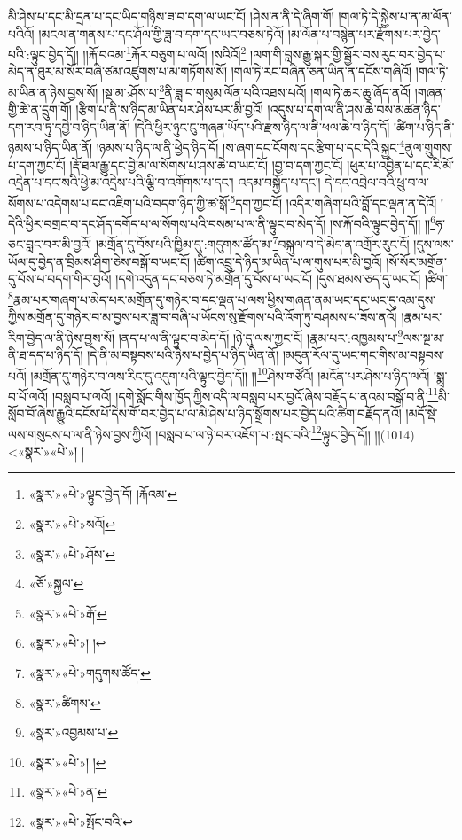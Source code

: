 མི་ཤེས་པ་དང་མི་དྲན་པ་དང་ཡིད་གཉིས་ཟ་བ་དག་ལ་ཡང་ངོ། །ཤེས་ན་ནི་དེ་ཞིག་གོ། །གལ་ཏེ་དེ་སྐྱེས་པ་ན་མ་ལོན་པའིའོ། །མངལ་ན་གནས་པ་དང་ཤོལ་གྱི་ཟླ་བ་དག་དང་ཡང་བཅས་ཏེའོ། །མ་ལོན་པ་བསྙེན་པར་རྫོགས་པར་བྱེད་པའི་:ལྟུང་བྱེད་དོ།། །།རྐོ་བའམ་\footnote{«སྣར་»«པེ་»ལྟུང་བྱེད་དོ། །རྐོའམ་}རྐོར་བཅུག་པ་ལའོ། །སའིའོ།\footnote{«སྣར་»«པེ་»སའོ།} །ལག་གི་བླས་རྒྱུ་སྐར་གྱི་སྦྱོར་བས་རུང་བར་བྱེད་པ་མེད་ན་ཐུར་མ་སོར་བཞི་ཙམ་འཛུགས་པ་མ་གཏོགས་སོ། །གལ་ཏེ་རང་བཞིན་ཅན་ཡིན་ན་དངོས་གཞིའོ། །གལ་ཏེ་མ་ཡིན་ན་ཉེས་བྱས་སོ། །སྔ་མ་:ཤོས་པ་\footnote{«སྣར་»«པེ་»ཤོས་}ནི་ཟླ་བ་གསུམ་ལོན་པའི་འཐས་པའོ། །གལ་ཏེ་ཆར་ཆུ་ཞོད་ནའོ། །གཞན་གྱི་ཚེ་ན་དྲུག་གོ། །རྩིག་པ་ནི་ས་ཉིད་མ་ཡིན་པར་ཤེས་པར་མི་བྱའོ། །འདུས་པ་དག་ལ་ནི་ཤས་ཆེ་བས་མཚན་ཉིད་དག་རབ་ཏུ་དབྱེ་བ་ཉིད་ཡིན་ནོ། །དེའི་ཕྱིར་ཉུང་ངུ་གཞན་ཡོད་པའི་རྫས་ཉིད་ལ་ནི་ཕལ་ཆེ་བ་ཉིད་དོ། །ཚིག་པ་ཉིད་ནི་ཉམས་པ་ཉིད་ཡིན་ནོ། །ཉམས་པ་ཉིད་ལ་ནི་ཕྱེད་ཉིད་དོ། །ས་ཞག་དང་ངོགས་དང་རྩིག་པ་དང་དེའི་སྐྱང་\footnote{«ཅོ་»སྐྱལ་}ནུལ་གྲུགས་པ་དག་ཀྱང་ངོ། །རྡོ་ཐལ་རྒྱུ་དང་བྱེ་མ་ལ་སོགས་པ་ཤས་ཆེ་བ་ཡང་ངོ། །བྱ་བ་དག་ཀྱང་ངོ། །ཕུར་པ་འབྱིན་པ་དང་རི་མོ་འདྲེན་པ་དང་སའི་ཕྱེ་མ་འདྲེས་པའི་ལྕི་བ་འགོགས་པ་དང་། འདམ་བསྐྱོད་པ་དང་། དེ་དང་འབྲེལ་བའི་ཕྲུ་བ་ལ་སོགས་པ་འདེགས་པ་དང་འཇིག་པའི་བདག་ཉིད་ཀྱི་ཚ་སྒོ་\footnote{«སྣར་»«པེ་»རྒོ་}དག་ཀྱང་ངོ། །འདིར་གཞིག་པའི་བློ་དང་ལྡན་ན་དེའོ། །དེའི་ཕྱིར་བགྲང་བ་དང་ཤོད་དགོད་པ་ལ་སོགས་པའི་བསམ་པ་ལ་ནི་ལྟུང་བ་མེད་དོ། །ས་རྐོ་བའི་ལྟུང་བྱེད་དོ།། །།\footnote{«སྣར་»«པེ་»། །}ཧ་ཅང་བླང་བར་མི་བྱའོ། །མགྲོན་དུ་བོས་པའི་ཁྱིམ་དུ་:གདུགས་ཚོད་མ་\footnote{«སྣར་»«པེ་»གདུགས་ཚོད་}བསྐུལ་བ་དེ་མེད་ན་འགྲོར་རུང་ངོ། །དུས་ལས་ཡོལ་དུ་བྱེད་ན་བྲིམས་ཤིག་ཅེས་བསྒོ་བ་ཡང་ངོ། །ཚིག་འབྲུ་དེ་ཉིད་མ་ཡིན་པ་ལ་གུས་པར་མི་བྱའོ། །སོ་སོར་མགྲོན་དུ་བོས་པ་བདག་གིར་བྱའོ། །དགེ་འདུན་དང་བཅས་ཏེ་མགྲོན་དུ་བོས་པ་ཡང་ངོ། །དུས་ཐམས་ཅད་དུ་ཡང་ངོ། །ཚིག་\footnote{«སྣར་»ཚིགས་}རྣམ་པར་གཞག་པ་མེད་པར་མགྲོན་དུ་གཉེར་བ་དང་ལྡན་པ་ལས་ཕྱིས་གཞན་ནམ་ཡང་དང་ཡང་དུ་འམ་དུས་ཀྱིས་མགྲོན་དུ་གཉེར་བ་མ་བྱས་པར་ཟླ་བ་བཞི་པ་ཡོངས་སུ་རྫོགས་པའི་འོག་ཏུ་བཤམས་པ་ཟོས་ནའོ། །རྣམ་པར་རིག་བྱེད་ལ་ནི་ཉེས་བྱས་སོ། །ནད་པ་ལ་ནི་ལྟུང་བ་མེད་དོ། །ཉེ་དུ་ལས་ཀྱང་ངོ། །རྣམ་པར་:འཁྱམས་པ་\footnote{«སྣར་»འབྱམས་པ་}ལས་སྔ་མ་ནི་ཐ་དད་པ་ཉིད་དོ། །དེ་ནི་མ་བསྟབས་པའི་ཉེས་པ་བྱེད་པ་ཉིད་ཡིན་ནོ། །མདུན་རོལ་དུ་ཡང་གང་གིས་མ་བསྟབས་པའོ། །མགྲོན་དུ་གཉེར་བ་ལས་རིང་དུ་འདུག་པའི་ལྟུང་བྱེད་དོ།། །།\footnote{«སྣར་»«པེ་»། །}ཤེས་གཙོའོ། །མངོན་པར་ཤེས་པ་ཉིད་ལའོ། །སྨྲ་བ་པོ་ལའོ། །བསླབ་པ་ལའོ། །དགེ་སློང་གིས་ཁྱོད་ཀྱིས་འདི་ལ་བསླབ་པར་བྱའོ་ཞེས་བརྗོད་པ་ནའམ་བསྒོ་བ་ནི་\footnote{«སྣར་»«པེ་»ན་}མི་སློབ་བོ་ཞེས་རྒྱུའི་དངོས་པོ་དེས་གོ་བར་བྱེད་པ་ལ་མི་ཤེས་པ་ཉིད་སྒྲོགས་པར་བྱེད་པའི་ཚིག་བརྗོད་ནའོ། །མདོ་སྡེ་ལས་གསུངས་པ་ལ་ནི་ཉེས་བྱས་ཀྱིའོ། །བསླབ་པ་ལ་ཉེ་བར་འཇོག་པ་:སྤང་བའི་\footnote{«སྣར་»«པེ་»སྤོང་བའི་}ལྟུང་བྱེད་དོ།། །།(1014) <«སྣར་»«པེ་»། །
